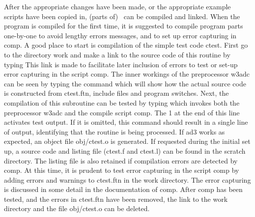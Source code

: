 \noindent
After the appropriate changes have been made, or the appropriate example
scripts have been copied in, (parts of) \ws\ can be compiled and linked. When
the program is compiled for the first time, it is suggested to compile program
parts one-by-one to avoid lengthy errors messages, and to set up error
capturing in {\file comp}. A good place to start is compilation of the simple
test code {\F ctest}. First go to the directory {\dir work} and make a link to
the source code of this routine by typing  This link is
made to facilitate later inclusion of errors to test or set-up error capturing
in the script {\file comp}. The inner workings of the preprocessor {\file
  w3adc} can be seen by typing the command  which
will show how the actual source code is constructed from {\file ctest.ftn},
include files and program switches. Next, the compilation of this subroutine
can be tested by typing  which invokes both the
preprocessor {\file w3adc} and the compile script {\file comp}. The 1 at the
end of this line activates test output. If it is omitted, this command should
result in a single line of output, identifying that the routine is being
processed. If {\file ad3} works as expected, an object file {\file
  obj/ctest.o} is generated. If requested during the initial set up, a source
code and listing file ({\file ctest.f} and {\file ctest.l}) can be found in
the scratch directory. The listing file is also retained if compilation errors
are detected by {\file comp}. At this time, it is prudent to test error
capturing in the script {\file comp} by adding errors and warnings to {\file
  ctest.ftn} in the work directory. The error capturing is discussed in some
detail in the documentation of {\file comp}. After {\file comp} has been
tested, and the errors in {\file ctest.ftn} have been removed, the link to the
work directory and the file {\file obj/ctest.o} can be deleted.

